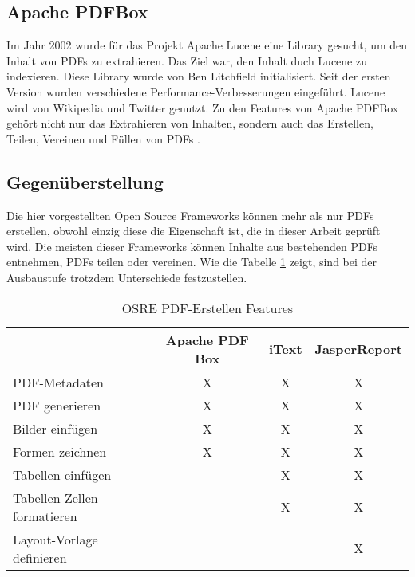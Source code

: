 \documentclass[main.tex]{subfiles}
\begin{document}
\subsection{Apache PDFBox}
Im Jahr 2002 wurde für das Projekt Apache Lucene eine Library gesucht, um den Inhalt von PDFs zu extrahieren. Das Ziel war, den Inhalt duch Lucene zu indexieren. Diese Library wurde von Ben Litchfield initialisiert. Seit der ersten Version wurden verschiedene Performance-Verbesserungen eingeführt. Lucene wird von Wikipedia und Twitter genutzt. Zu den Features von Apache PDFBox gehört nicht nur das Extrahieren von Inhalten, sondern auch das Erstellen, Teilen, Vereinen und Füllen von PDFs \cite{apachepdfbox_history}.


\subsection{Gegenüberstellung}

Die hier vorgestellten Open Source Frameworks können mehr als nur PDFs erstellen, obwohl einzig diese die Eigenschaft ist, die in dieser Arbeit geprüft wird. Die meisten dieser Frameworks können Inhalte aus bestehenden PDFs entnehmen, PDFs teilen oder vereinen. 
Wie die Tabelle \ref{table:featuresOSRE} zeigt, sind bei der Ausbaustufe trotzdem Unterschiede festzustellen. 


\begin{table}[h]
\centering

\begin{tabular}{lccc}
               & Apache PDF Box & iText  & JasperReport \\ \hline
PDF-Metadaten           &         X      &   X    &     X        \\
PDF generieren   &         X      &   X    &     X        \\
Bilder einfügen         &  X             &   X    &     X        \\
Formen zeichnen         &  X             &   X    &     X        \\
Tabellen einfügen                &                &   X    &     X        \\
Tabellen-Zellen formatieren      &                &   X    &     X        \\
Layout-Vorlage definieren         &                &        &     X        \\
\end{tabular}
\caption{OSRE PDF-Erstellen Features}
\label{table:featuresOSRE}
\end{table}
\end{document}
